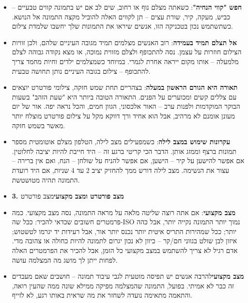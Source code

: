 \begin{itemize}
  \item \textbf{חפש "קווי הנחיה"}: כשאתה מצלם נוף או רחוב, שים לב אם יש בתמונה קווים טבעיים – כביש, מעקה, קיר, שורת עצים – תן לקווים האלה להוביל מקצה התמונה אל הנושא. כשתשתמש נכון בטכניקה הזו, אנשים שיראו את התמונות שלך יחשבו שלמדת צילום.
  \item \textbf{אל תצלם תמיד בעמידה}: רוב האנשים מצלמים תמיד מגובה העיניים שלהם, ולכן זוויות הצילום חוזרות על עצמן. נסה להתכופף ולצלם מזווית נמוכה, או מצא נקודה גבוהה לצלם מלמעלה – אותו מקום ייראה אחרת לגמרי. במיוחד כשמצלמים ילדים וחיות מחמד צריך להתכופף – צילום בגובה העיניים נותן תחושה טבעית.
  \item \textbf{תאורה היא הגורם הראשון במעלה}: בצהריים תחת שמש חזקה, צילומי פורטרט יוצאים עם צללים קשים ומכוערים על הפנים. התאורה הטובה ביותר היא "שעת הזהב" בשעות הבוקר המוקדמות ולפנות ערב – האור אלכסוני, הגוון חמים, והכל נראה יפה. אור של יום מעונן אומנם לא מרהיב, אבל הוא אחיד ורך דווקא מקל על צילום פורטרט מוצלח יותר מאשר בשמש חזקה.
  \item \textbf{עקרונות שימוש במצב לילה}: כשמפעילים מצב לילה, הטלפון מצלם אוטומטית מספר תמונות ברצף וממזג אותן. הדבר הכי קריטי ברגע זה – היד חייבת להיות יציבה לחלוטין. אם אפשר להישען על קיר – הישען, אם אפשר להניח על שולחן – הנח, ואם אין ברירה – עצור את הנשימה. מצב לילה דורש ממך להחזיק יציב 2 עד 4 שניות, אם היד רועדת התמונה תהיה מטושטשת.
  \item \textbf{3. מצב פורטרט ומצב מקצועי}מצב פורטרט
\end{itemize}


\begin{itemize}
  \item \textbf{מצב מקצועי}: אם אתה רוצה שליטה מלאה על מראה התמונה, נסה מצב מקצועי. כמה פרמטרים חשובים שכדאי להכיר: ככל שה-ISO נמוך יותר התמונה נקייה יותר, אבל כהה יותר; ככל שמהירות התריס איטית יותר נכנס יותר אור, אבל רעידות יד יגרמו לטשטוש; איזון לבן שולט בגווני חם/קר – כיוון לא נכון יגרום לתמונה להיות כחולה או צהובה מדי. אדם רגיל לא צריך להשתמש במצב מקצועי כל הזמן, אבל להכיר את הפרמטרים האלה לפחות ייתן לך מושג מה המצלמה עושה.
  \item \textbf{מצב מקצועי}להרבה אנשים יש תפיסה מוטעית לגבי עיבוד תמונה – חושבים שאם מעבדים זה כבר לא אמיתי. בפועל, התמונה שהמצלמה מפיקה ממילא שונה ממה שהעין רואה, והתאמה מתאימה נועדה לשחזר את מה שראית באותו רגע, לא לזייף.
\end{itemize}

